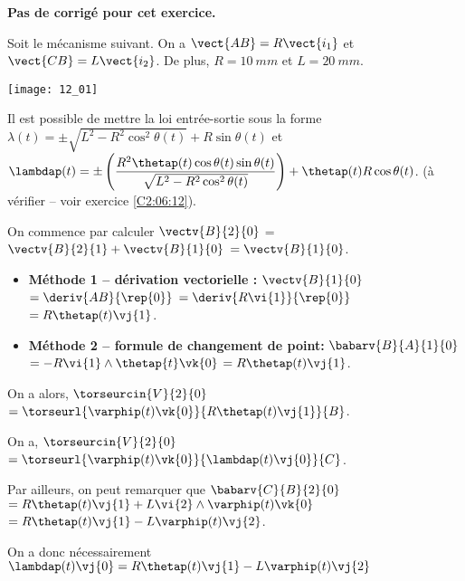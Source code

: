 \normaltrue \difficilefalse \tdifficilefalse
\correctionfalse


\setcounter{numques}{0}
\ifcorrection
\else
\textbf{Pas de corrigé pour cet exercice.}
\fi

\ifprof
\else
Soit le mécanisme suivant. On a $\vect{AB}=R\vect{i_1}$ et $\vect{CB}=L\vect{i_2}$. De plus, 
$R=\SI{10}{mm}$ et $L=\SI{20}{mm}$. 

\begin{center}
\texttt{[image: 12\_01]}
\end{center}
\fi

Il est possible de mettre la loi entrée-sortie sous la forme  
$\lambda(t) = \pm\sqrt{L^2 - R^2\cos^2\theta(t)} + R\sin\theta(t) $ 
et 
$\lambdap(t) = \pm\left( \dfrac{R^2 \thetap(t) \cos\theta(t)\sin\theta(t)}{\sqrt{L^2 - R^2\cos^2\theta(t)}}\right) + \thetap(t)R\cos\theta(t)$.
 (à vérifier -- voir exercice \ref{C2:06:12}).

On commence par calculer $\vectv{B}{2}{0}$ = $\vectv{B}{2}{1}+\vectv{B}{1}{0}$ $=\vectv{B}{1}{0}$.
\begin{itemize}
\item \textbf{Méthode 1 -- dérivation vectorielle :}  $\vectv{B}{1}{0}$ $=\deriv{AB}{\rep{0}}$ 
$=\deriv{R\vi{1}}{\rep{0}}$ 
$= R\thetap(t) \vj{1}$. 
\item \textbf{Méthode 2 -- formule de changement de point: }
$\babarv{B}{A}{1}{0}$ 
$= -R\vi{1}\wedge \thetap{t} \vk{0}$
$= R\thetap(t) \vj{1}$.
\end{itemize}

On a alors, 
$\torseurcin{V}{2}{0}$
$=\torseurl{\varphip(t)\vk{0}}{R\thetap(t) \vj{1}}{B}$.

\ifprof
\else
\fi


On a, 
$\torseurcin{V}{2}{0}$
$=\torseurl{\varphip(t)\vk{0}}{\lambdap(t) \vj{0}}{C}$.

Par ailleurs, on peut remarquer que 
$\babarv{C}{B}{2}{0}$
$= R\thetap(t) \vj{1} + L\vi{2}\wedge\varphip(t) \vk{0}$ 
$= R\thetap(t) \vj{1} - L\varphip(t)\vj{2}$.

On a donc nécessairement 
$\lambdap(t) \vj{0}= R\thetap(t) \vj{1} - L\varphip(t)\vj{2}$

